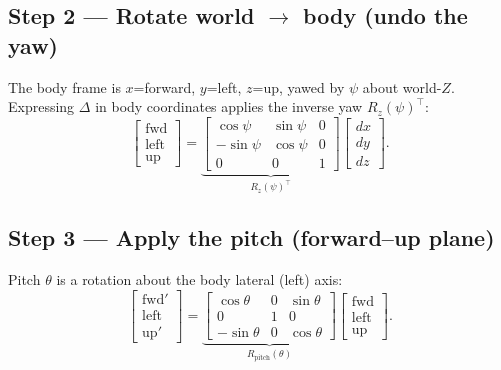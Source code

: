 \documentclass[11pt]{article}
\begin{document}
\subsection*{Step 2 — Rotate world $\to$ body (undo the yaw)}
The body frame is $x$=forward, $y$=left, $z$=up, yawed by $\psi$ about world-$Z$.
Expressing $\Delta$ in body coordinates applies the inverse yaw $R_z(\psi)^\top$:
\[
\begin{bmatrix} \text{fwd} \\ \text{left} \\ \text{up} \end{bmatrix}
=
\underbrace{\begin{bmatrix}
\cos\psi & \sin\psi & 0 \\
-\sin\psi & \cos\psi & 0 \\
0 & 0 & 1
\end{bmatrix}}_{R_z(\psi)^\top}
\begin{bmatrix} dx \\ dy \\ dz \end{bmatrix}.
\]

\subsection*{Step 3 — Apply the pitch (forward--up plane)}
Pitch $\theta$ is a rotation about the body lateral (left) axis:
\[
\begin{bmatrix} \text{fwd}' \\ \text{left} \\ \text{up}' \end{bmatrix}
=
\underbrace{\begin{bmatrix}
\cos\theta & 0 & \sin\theta \\
0 & 1 & 0 \\
-\sin\theta & 0 & \cos\theta
\end{bmatrix}}_{R_{\text{pitch}}(\theta)}
\begin{bmatrix} \text{fwd} \\ \text{left} \\ \text{up} \end{bmatrix}.
\]
\end{document}

